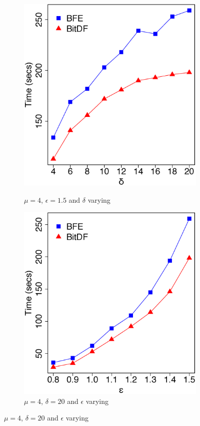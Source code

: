 {\begin{figure}[h!]
    \centering
    \caption{Results varying $\delta$ and $\epsilon$ for Trucks dataset}
    \begin{subfigure}[t]{0.48\textwidth}
        \caption{$\mu = 4$, $\epsilon = 1.5$ and $\delta$ varying}
        \includegraphics[width=\textwidth]{images/Trucks_n_4_g_1_5_varying_l.eps}
        \label{fig:trucks_vary_l}
    \end{subfigure}
    \begin{subfigure}[t]{0.48\textwidth}
        \caption{$\mu = 4$, $\delta = 20$ and $\epsilon$ varying}
        \includegraphics[width=\textwidth]{images/Trucks_n_4_l_20_varying_g.eps}

\end{subfigure}
\end{figure}}
